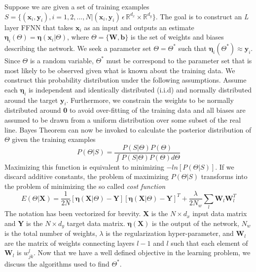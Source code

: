 Suppose we are given a set of training examples $S=\lbrace(\textbf{x}_i, \textbf{y}_i), i=1,2,...,N| (\textbf{x}_i, \textbf{y}_i)\, \epsilon \, \mathbb{R}^{d_x} \times \mathbb{R}^{d_y}\rbrace$. The goal is to construct an \textit{L} layer FFNN that takes $\textbf{x}_i$ as an input and outputs an estimate $\boldsymbol{\eta}_i(\Theta)=\boldsymbol{\eta}(\textbf{x}_i| \Theta)$, where $\Theta=\lbrace \textbf{W}, \textbf{b} \rbrace$ is the set of weights and biases describing the network. We seek a parameter set $\Theta=\Theta^*$ such that $\boldsymbol{\eta}_i(\Theta^*)\approx\textbf{y}_i$. Since $\Theta$ is a random variable, $\Theta^*$ must be correspond to the parameter set that is most likely to be observed given what is known about the training data. We construct this probability distribution under the following assumptions. Assume each $\boldsymbol{\eta}_i$ is independent and identically distributed (i.i.d) and normally distributed around the target $\textbf{y}_i$. Furthermore, we constrain the weights to be normally distributed around \textbf{0} to avoid over-fitting of the training data and all biases are assumed to be drawn from a uniform distribution over some subset of the real line. Bayes Theorem can now be invoked to calculate the posterior distribution of $\Theta$ given the training examples
\begin{equation}
P(\Theta|S) = \frac{P(S|\Theta)P(\Theta)}{\int P(S|\Theta)P(\Theta) d\Theta}
\end{equation}
Maximizing this function is equivalent to minimizing $-ln\left[P(\Theta|S)\right]$. If we discard additive constants, the problem of maximizing $P(\Theta|S)$ transforms into the problem of minimizing the so called \textit{cost function}
\begin{equation}
E(\Theta|\textbf{X}) = \frac{1}{2N} \left[\boldsymbol{\eta}(\textbf{X}|\Theta) - \textbf{Y}\right] {\left[\boldsymbol{\eta}(\textbf{X}|\Theta) - \textbf{Y}\right]}^T \nonumber + \frac{\lambda}{2N_w}\sum_{l} \textbf{W}_l \textbf{W}_l^T
\label{cost_cost}
\end{equation}
The notation has been vectorized for brevity. \textbf{X} is the $N \times d_x$ input data matrix and \textbf{Y} is the $N \times d_y$ target data matrix. $\boldsymbol{\eta}(\textbf{X})$ is the output of the network, $N_w$ is the total number of weights, $\lambda$ is the regularization hyper-parameter, and $\textbf{W}_l$ are the matrix of weights connecting layers $l-1$ and $l$ such that each element of $\textbf{W}_l$ is $w^l_{jk}$. Now that we have a well defined objective in the learning problem, we discuss the algorithms used to find $\Theta^*$.
